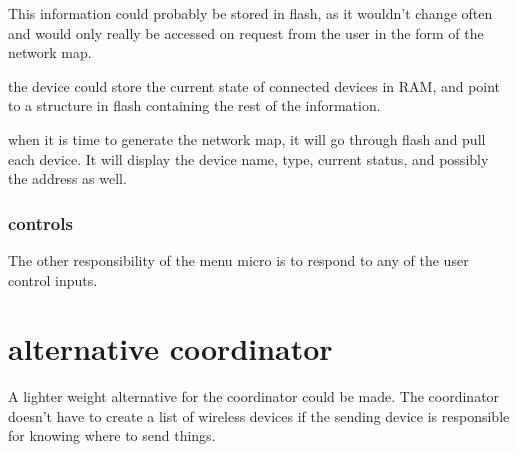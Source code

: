 \documentclass{article}
\begin{document}
     This information could probably be stored in flash, as it wouldn't change often and would only really be accessed on request from the user in the form of the network map.
     
     the device could store the current state of connected devices in RAM, and point to a structure in flash containing the rest of the information.
     
     when it is time to generate the network map, it will go through flash and pull each device.
     It will display the device name, type, current status, and possibly the address as well.
     
     
     \subsubsection{controls}
     The other responsibility of the menu micro is to respond to any of the user control inputs.
     
     \section{alternative coordinator}
     A lighter weight alternative for the coordinator could be made.
     The coordinator doesn't have to create a list of wireless devices if the sending device is responsible for
     knowing where to send things.
     
\end{document}
